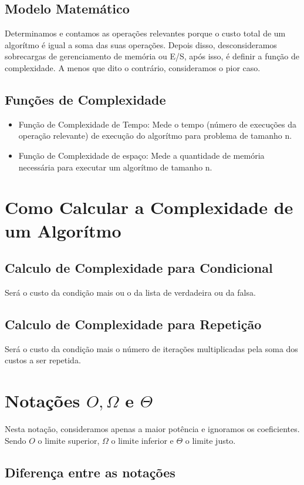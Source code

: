\documentclass[12pt]{article}
\begin{document}
    \subsection{Modelo Matemático}
        Determinamos e contamos as operações relevantes porque o custo total de um algorítmo é igual a soma das suas operações.
        Depois disso, desconsideramos sobrecargas de gerenciamento de memória ou E/S, após isso, é definir a função de complexidade. 
        A menos que dito o contrário, consideramos o pior caso.
    \subsection{Funções de Complexidade}
        \begin{itemize}
            \item Função de Complexidade de Tempo: Mede o tempo (número de execuções da operação relevante) de execução do algorítmo para problema de tamanho n.
            \item Função de Complexidade de espaço: Mede a quantidade de memória necessária para executar um algorítmo de tamanho n.
        \end{itemize}
\section{Como Calcular a Complexidade de um Algorítmo}
    \subsection{Calculo de Complexidade para Condicional}
        Será o custo da condição mais ou o da lista de verdadeira ou da falsa.
    \subsection{Calculo de Complexidade para Repetição}
    Será o custo da condição mais o número de iterações multiplicadas pela soma dos custos a ser repetida.
\section{Notações $O, \Omega $ e $ \Theta$}
Nesta notação, consideramos apenas a maior potência e ignoramos os coeficientes.
Sendo $O$ o limite superior, $\Omega$ o limite inferior e $\Theta$ o limite justo.
        \subsection{Diferença entre as notações}
\end{document}
